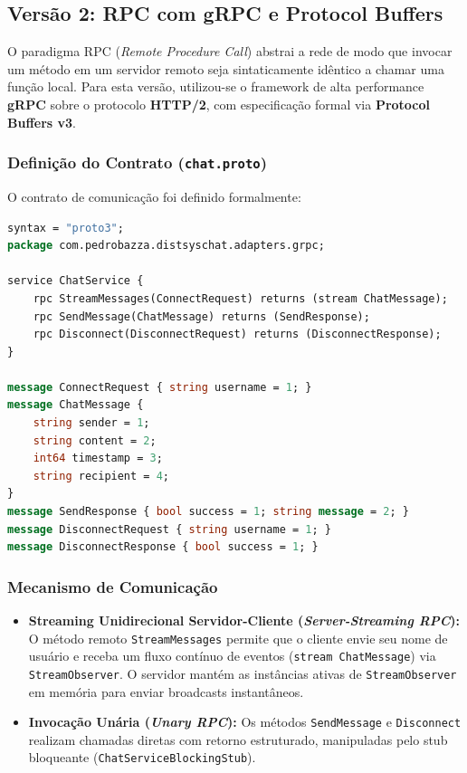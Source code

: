 \documentclass[12pt,a4paper]{article}
\begin{document}
\subsection{Versão 2: RPC com gRPC e Protocol Buffers}
O paradigma RPC (\textit{Remote Procedure Call}) abstrai a rede de modo que invocar um método em um servidor remoto seja sintaticamente idêntico a chamar uma função local. Para esta versão, utilizou-se o framework de alta performance \textbf{gRPC} sobre o protocolo \textbf{HTTP/2}, com especificação formal via \textbf{Protocol Buffers v3}.

\subsubsection{Definição do Contrato (\texttt{chat.proto})}
O contrato de comunicação foi definido formalmente:
\begin{lstlisting}[language=protobuf]
syntax = "proto3";
package com.pedrobazza.distsyschat.adapters.grpc;

service ChatService {
    rpc StreamMessages(ConnectRequest) returns (stream ChatMessage);
    rpc SendMessage(ChatMessage) returns (SendResponse);
    rpc Disconnect(DisconnectRequest) returns (DisconnectResponse);
}

message ConnectRequest { string username = 1; }
message ChatMessage {
    string sender = 1;
    string content = 2;
    int64 timestamp = 3;
    string recipient = 4;
}
message SendResponse { bool success = 1; string message = 2; }
message DisconnectRequest { string username = 1; }
message DisconnectResponse { bool success = 1; }
\end{lstlisting}

\subsubsection{Mecanismo de Comunicação}
\begin{itemize}
    \item \textbf{Streaming Unidirecional Servidor-Cliente (\textit{Server-Streaming RPC}):} O método remoto \texttt{StreamMessages} permite que o cliente envie seu nome de usuário e receba um fluxo contínuo de eventos (\texttt{stream ChatMessage}) via \texttt{StreamObserver}. O servidor mantém as instâncias ativas de \texttt{StreamObserver} em memória para enviar broadcasts instantâneos.
    \item \textbf{Invocação Unária (\textit{Unary RPC}):} Os métodos \texttt{SendMessage} e \texttt{Disconnect} realizam chamadas diretas com retorno estruturado, manipuladas pelo stub bloqueante (\texttt{ChatServiceBlockingStub}).
\end{itemize}
\end{document}
